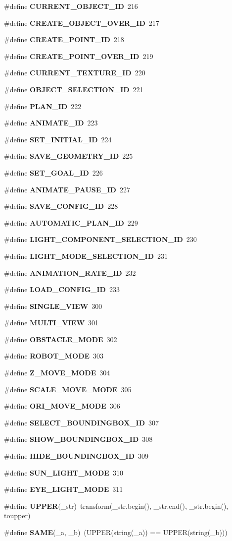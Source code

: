 \begin{CompactItemize}
\item 
\#define {\bf CURRENT\_\-OBJECT\_\-ID}\ 216
\item 
\#define {\bf CREATE\_\-OBJECT\_\-OVER\_\-ID}\ 217
\item 
\#define {\bf CREATE\_\-POINT\_\-ID}\ 218
\item 
\#define {\bf CREATE\_\-POINT\_\-OVER\_\-ID}\ 219
\item 
\#define {\bf CURRENT\_\-TEXTURE\_\-ID}\ 220
\item 
\#define {\bf OBJECT\_\-SELECTION\_\-ID}\ 221
\item 
\#define {\bf PLAN\_\-ID}\ 222
\item 
\#define {\bf ANIMATE\_\-ID}\ 223
\item 
\#define {\bf SET\_\-INITIAL\_\-ID}\ 224
\item 
\#define {\bf SAVE\_\-GEOMETRY\_\-ID}\ 225
\item 
\#define {\bf SET\_\-GOAL\_\-ID}\ 226
\item 
\#define {\bf ANIMATE\_\-PAUSE\_\-ID}\ 227
\item 
\#define {\bf SAVE\_\-CONFIG\_\-ID}\ 228
\item 
\#define {\bf AUTOMATIC\_\-PLAN\_\-ID}\ 229
\item 
\#define {\bf LIGHT\_\-COMPONENT\_\-SELECTION\_\-ID}\ 230
\item 
\#define {\bf LIGHT\_\-MODE\_\-SELECTION\_\-ID}\ 231
\item 
\#define {\bf ANIMATION\_\-RATE\_\-ID}\ 232
\item 
\#define {\bf LOAD\_\-CONFIG\_\-ID}\ 233
\item 
\#define {\bf SINGLE\_\-VIEW}\ 300
\item 
\#define {\bf MULTI\_\-VIEW}\ 301
\item 
\#define {\bf OBSTACLE\_\-MODE}\ 302
\item 
\#define {\bf ROBOT\_\-MODE}\ 303
\item 
\#define {\bf Z\_\-MOVE\_\-MODE}\ 304
\item 
\#define {\bf SCALE\_\-MOVE\_\-MODE}\ 305
\item 
\#define {\bf ORI\_\-MOVE\_\-MODE}\ 306
\item 
\#define {\bf SELECT\_\-BOUNDINGBOX\_\-ID}\ 307
\item 
\#define {\bf SHOW\_\-BOUNDINGBOX\_\-ID}\ 308
\item 
\#define {\bf HIDE\_\-BOUNDINGBOX\_\-ID}\ 309
\item 
\#define {\bf SUN\_\-LIGHT\_\-MODE}\ 310
\item 
\#define {\bf EYE\_\-LIGHT\_\-MODE}\ 311
\item 
\#define {\bf UPPER}(\_\-str)\ transform(\_\-str.begin(), \_\-str.end(), \_\-str.begin(), toupper)
\item 
\#define {\bf SAME}(\_\-a, \_\-b)\ (UPPER(string(\_\-a)) == UPPER(string(\_\-b)))
\end{CompactItemize}

